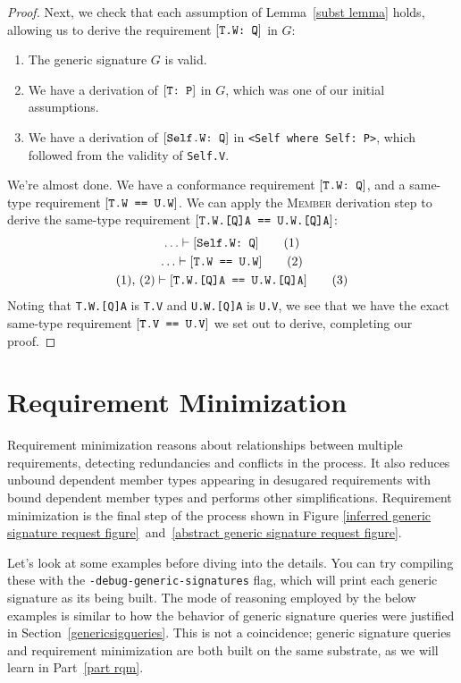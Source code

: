 \documentclass[../generics]{subfiles}
\begin{document}
\begin{proof}
Next, we check that each assumption of Lemma~\ref{subst lemma} holds, allowing us to derive the requirement $[\texttt{T.W:~Q}]$ in $G$:
\begin{enumerate}
\item The generic signature $G$ is valid.
\item We have a derivation of $[\texttt{T:~P}]$ in $G$, which was one of our initial assumptions.
\item We have a derivation of $[\texttt{Self.W:~Q}]$ in \verb|<Self where Self: P>|, which followed from the validity of \texttt{Self.V}.
\end{enumerate}

We're almost done. We have a conformance requirement $[\texttt{T.W:~Q}]$, and a same-type requirement
$[\texttt{T.W == U.W}]$. We can apply the \textsc{Member} derivation step to derive the same-type requirement $[\texttt{T.W.[Q]A == U.W.[Q]A}]$:
\begin{gather*}
\ldots\vdash [\texttt{Self.W:~Q}]\tag{1}\\
\ldots\vdash [\texttt{T.W == U.W}]\tag{2}\\
(1),\,(2)\vdash [\texttt{T.W.[Q]A == U.W.[Q]A}]\tag{3}
\end{gather*}
Noting that \texttt{T.W.[Q]A} is \texttt{T.V} and \texttt{U.W.[Q]A} is \texttt{U.V}, we see that we have the exact same-type requirement $[\texttt{T.V == U.V}]$ we set out to derive, completing our proof.
\end{proof}

\section{Requirement Minimization}\label{minimal requirements}

Requirement minimization reasons about relationships between multiple requirements, detecting redundancies and conflicts in the process. It also reduces unbound dependent member types appearing in desugared requirements with bound dependent member types and performs other simplifications. Requirement minimization is the final step of the process shown in Figure \ref{inferred generic signature request figure}~and~\ref{abstract generic signature request figure}.

Let's look at some examples before diving into the details. You can try compiling these with the \texttt{-debug-generic-signatures} flag, which will print each generic signature as its being built. The mode of reasoning employed by the below examples is similar to how the behavior of generic signature queries were justified in Section~\ref{genericsigqueries}.
This is not a coincidence; generic signature queries and requirement minimization are both built on the same substrate, as we will learn in Part~\ref{part rqm}.
\end{document}
